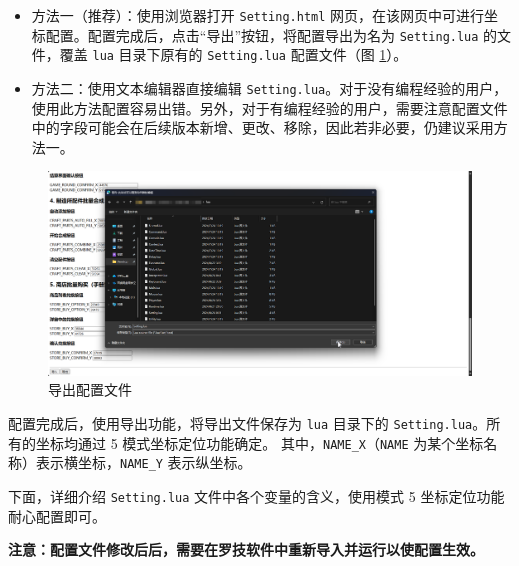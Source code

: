 \begin{itemize}
\item 方法一（推荐）：使用浏览器打开 \lstinline{Setting.html} 网页，在该网页中可进行坐标配置。配置完成后，点击“导出”按钮，将配置导出为名为 \lstinline{Setting.lua} 的文件，覆盖 \lstinline{lua} 目录下原有的 \lstinline{Setting.lua} 配置文件（图 \ref{ch2fig-export-setting}）。
\item 方法二：使用文本编辑器直接编辑 \lstinline{Setting.lua}。对于没有编程经验的用户，使用此方法配置容易出错。另外，对于有编程经验的用户，需要注意配置文件中的字段可能会在后续版本新增、更改、移除，因此若非必要，仍建议采用方法一。
\end{itemize}

\begin{figure}[H]
    \Centering
    \includegraphics[width=\textwidth]{docs/assets/export_setting}
    \caption{导出配置文件}
    \label{ch2fig-export-setting}
\end{figure}

配置完成后，使用导出功能，将导出文件保存为 \lstinline{lua} 目录下的 \lstinline{Setting.lua}。所有的坐标均通过 5 模式坐标定位功能确定。
其中，\lstinline{NAME_X}（\lstinline{NAME} 为某个坐标名称）表示横坐标，\lstinline{NAME_Y} 表示纵坐标。

下面，详细介绍 \lstinline{Setting.lua} 文件中各个变量的含义，使用模式 5 坐标定位功能耐心配置即可。

\textbf{\color{red}注意：配置文件修改后后，需要在罗技软件中重新导入并运行以使配置生效。}

